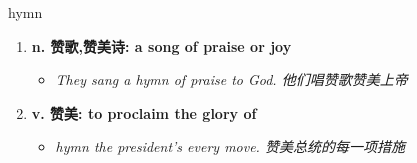 
\begin{frame}
{\huge hymn}
\begin{center}
\begin{enumerate}\Large
  \item \textbf{n. 赞歌,赞美诗: a song of praise or joy}
  \begin{itemize}
    \item \em{\Large{They sang a hymn of praise to God. 他们唱赞歌赞美上帝}}
  \end{itemize}
  \item \textbf{v. 赞美: to proclaim the glory of}
  \begin{itemize}
    \item \em{\Large{hymn the president's every move. 赞美总统的每一项措施}}
  \end{itemize}
\end{enumerate}
\end{center}
\end{frame}
